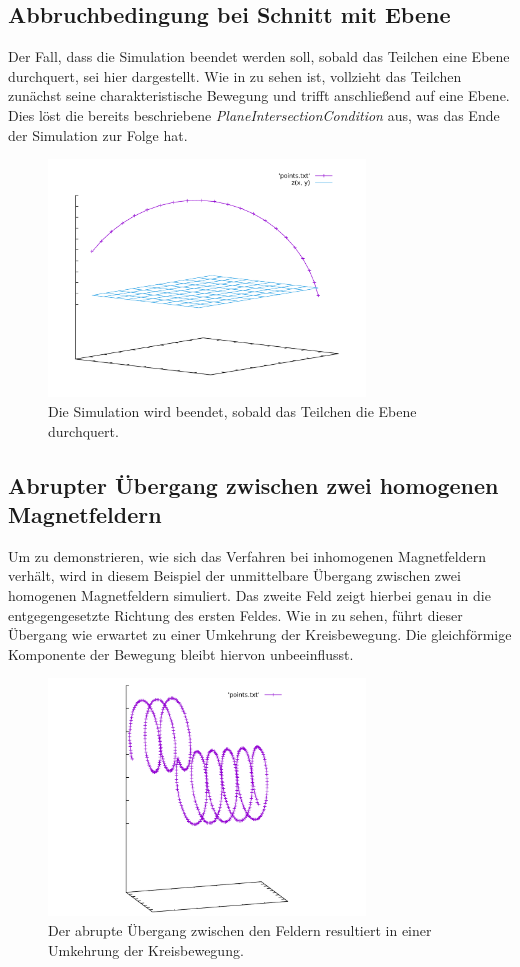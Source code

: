 \subsection{Abbruchbedingung bei Schnitt mit Ebene}

Der Fall, dass die Simulation beendet werden soll, sobald das Teilchen eine Ebene durchquert, sei hier dargestellt. Wie in
 zu sehen ist, vollzieht das Teilchen zun\"achst seine charakteristische Bewegung und trifft anschlie{\ss}end
auf eine Ebene. Dies l\"ost die bereits beschriebene \textit{PlaneIntersectionCondition} aus, was das Ende der Simulation zur Folge
hat.

\begin{figure}[h]
  \label{fig:stop_plane}
  \centering
  \includegraphics[width=0.75\textwidth]{gnuplot/stop_plane}
  \caption{Die Simulation wird beendet, sobald das Teilchen die Ebene durchquert.}
\end{figure}

\subsection{Abrupter \"Ubergang zwischen zwei homogenen Magnetfeldern}

Um zu demonstrieren, wie sich das Verfahren bei inhomogenen Magnetfeldern verh\"alt, wird in diesem Beispiel der unmittelbare
\"Ubergang zwischen zwei homogenen Magnetfeldern simuliert. Das zweite Feld zeigt hierbei genau in die entgegengesetzte Richtung
des ersten Feldes. Wie in  zu sehen, f\"uhrt dieser \"Ubergang wie erwartet zu einer Umkehrung der
Kreisbewegung. Die gleichf\"ormige Komponente der Bewegung bleibt hiervon unbeeinflusst.

\begin{figure}[h]
  \label{fig:two_fields}
  \centering
  \includegraphics[width=0.75\textwidth]{gnuplot/two_fields}
  \caption{Der abrupte \"Ubergang zwischen den Feldern resultiert in einer Umkehrung der Kreisbewegung.}
\end{figure}
